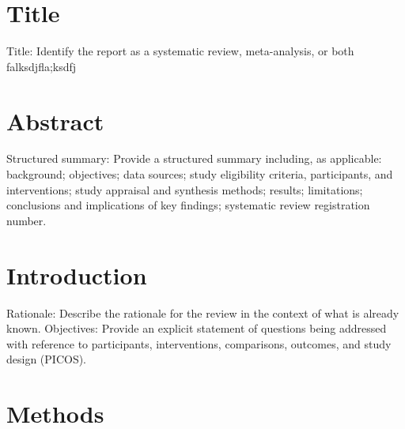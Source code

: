 \documentclass{article}\usepackage[]{graphicx}\usepackage[]{color}
\begin{document}
\section{Title}


Title: Identify the report as a systematic review, meta-analysis, or both falksdjfla;ksdfj

\section{Abstract}

Structured summary: Provide a structured summary including, as applicable: background; objectives; data sources; study eligibility criteria, participants, and interventions; study appraisal and synthesis methods; results; limitations; conclusions and implications of key findings; systematic review registration number.

\section{Introduction}

Rationale: Describe the rationale for the review in the context of what is already known. Objectives: Provide an explicit statement of questions being addressed with reference to participants, interventions, comparisons, outcomes, and study design (PICOS).

\section{Methods}
\end{document}
